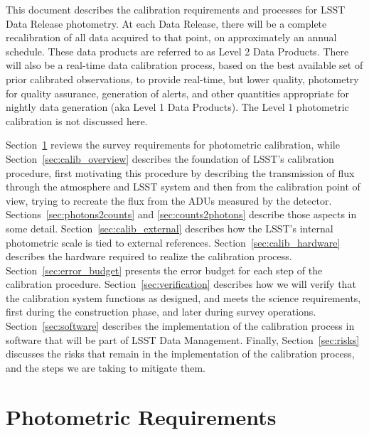 \documentclass[12pt,preprint]{aastex}
\begin{document}
This document describes the calibration requirements and processes for
LSST Data Release photometry. At each Data Release, there will be a
complete recalibration of all data acquired to that point, on
approximately an annual schedule.  These data products are referred to
as Level 2 Data Products.  There will
also be a real-time data calibration process, based on the best
available set of prior calibrated observations, to provide real-time, but lower quality,
                                                                                                 photometry for quality assurance,
generation of alerts, and other quantities appropriate for nightly
data generation (aka Level 1 Data Products).  The Level 1 photometric
calibration is not discussed here.

Section~\ref{sec:photoreq} reviews the survey requirements for
photometric calibration, while Section~\ref{sec:calib_overview}
describes the foundation of LSST's calibration procedure, first
motivating this procedure by describing the transmission of flux
through the atmosphere and LSST system and then from the calibration
point of view, trying to recreate the flux from the ADUs measured
by the detector.
Sections~\ref{sec:photons2counts} and \ref{sec:counts2photons}
describe those aspects in some detail.
Section~\ref{sec:calib_external} describes how the LSST's internal
photometric scale is tied to external references.
Section~\ref{sec:calib_hardware} describes the hardware required
to realize the calibration process.
Section~\ref{sec:error_budget} presents the error budget for each step of the 
calibration procedure.
Section~\ref{sec:verification} describes how we will verify that the
calibration system functions as designed, and meets the science
requirements, first during the construction phase, and later during
survey operations.
Section~\ref{sec:software} describes the implementation of the calibration process
in software that will be part of LSST Data Management.
Finally, Section~\ref{sec:risks} discusses the risks that remain in
the implementation of the calibration process, and the steps we are 
taking to mitigate them.


\section{Photometric Requirements}
\label{sec:photoreq}
\end{document}
